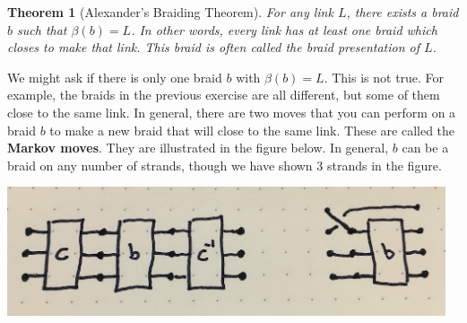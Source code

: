 \documentclass[12 pt]{article}
\newtheorem{theorem}{Theorem}
\newcounter{exercise}[section]
\begin{document}
\begin{theorem}[Alexander's Braiding Theorem]
	 For any link $L$, there exists a braid $b$ such that $\beta(b)=L$. In other words, every link has at least one braid which closes to make that link. This braid is often called the braid presentation of $L$.
\end{theorem}

We might ask if there is only one braid $b$ with $\beta(b)=L$. This is not true. For example, the braids in the previous exercise are all different, but some of them close to the same link. In general, there are two moves that you can perform on a braid $b$ to make a new braid that will close to the same link. These are called the \textbf{Markov moves}. They are illustrated in the figure below. In general, $b$ can be a braid on any number of strands, though we have shown 3 strands in the figure. \begin{center}
\includegraphics*[height = 1.5in]{markov_moves} \end{center}
\end{document}
